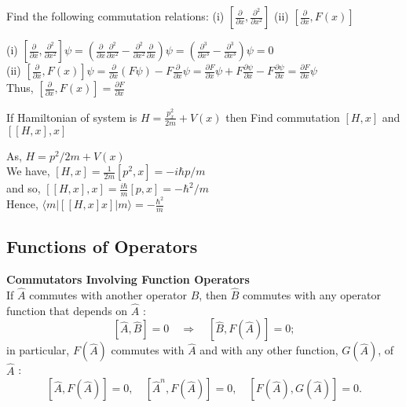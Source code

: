 \begin{exercise}
 Find the following commutation relations:
	(i) $\left[\frac{\partial}{\partial x}, \frac{\partial^{2}}{\partial x^{2}}\right]$
	(ii) $\left[\frac{\partial}{\partial x}, F(x)\right]$
\end{exercise}
\begin{answer}
(i) $\left[\frac{\partial}{\partial x}, \frac{\partial^{2}}{\partial x^{2}}\right] \psi=\left(\frac{\partial}{\partial x} \frac{\partial^{2}}{\partial x^{2}}-\frac{\partial^{2}}{\partial x^{2}} \frac{\partial}{\partial x}\right) \psi=\left(\frac{\partial^{3}}{\partial x^{3}}-\frac{\partial^{3}}{\partial x^{3}}\right) \psi=0$\\
(ii) $\left[\frac{\partial}{\partial x}, F(x)\right] \psi=\frac{\partial}{\partial x}(F \psi)-F \frac{\partial}{\partial x} \psi=\frac{\partial F}{\partial x} \psi+F \frac{\partial \psi}{\partial x}-F \frac{\partial \psi}{\partial x}=\frac{\partial F}{\partial x} \psi$\\
Thus, $\left[\frac{\partial}{\partial x}, F(x)\right]=\frac{\partial F}{\partial x}$	
\end{answer}
\begin{exercise}
	If Hamiltonian of system is $H=\frac{p_{x}^{2}}{2 m}+V(x)$ then Find commutation $[H, x]$ and $[[H, x], x]$
\end{exercise}
\begin{answer}
 As, $H=p^{2} / 2 m+V(x)$\\
We have, $[H, x]=\frac{1}{2 m}\left[p^{2}, x\right]=-i \hbar p / m$ \\
and so, $[[H, x], x]=\frac{i \hbar}{m}[p, x]=-\hbar^{2} / m$\\
 Hence, $\langle m|[[H, x] x]| m\rangle=-\frac{\hbar^{2}}{m}$	
\end{answer}
\subsection{Functions of Operators}
\textbf{Commutators Involving Function Operators}\\
If $\hat{A}$ commutes with another operator $\hat{B}$, then $\hat{B}$ commutes with any operator function that depends on $\hat{A}$ :
$$
[\hat{A}, \hat{B}]=0 \quad \Longrightarrow \quad[\hat{B}, F(\hat{A})]=0 ;
$$
in particular, $F(\hat{A})$ commutes with $\hat{A}$ and with any other function, $G(\hat{A})$, of $\hat{A}$ :
$$
[\hat{A}, F(\hat{A})]=0, \quad\left[\hat{A}^{n}, F(\hat{A})\right]=0, \quad[F(\hat{A}), G(\hat{A})]=0 .
$$
